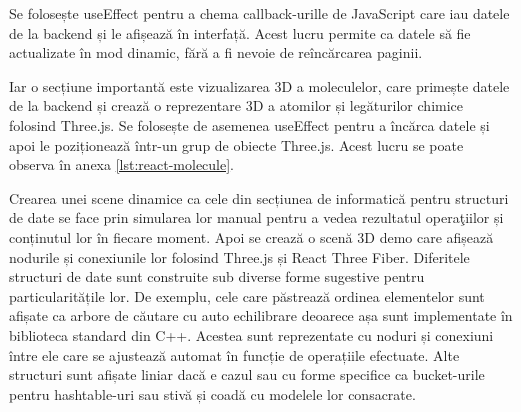 Se folosește useEffect pentru a chema
callback-urille de JavaScript care iau datele de la backend și le afișează în interfață.
Acest lucru permite ca datele să fie actualizate în mod dinamic, fără a fi nevoie 
de reîncărcarea paginii.


Iar o secțiune importantă este vizualizarea 3D a moleculelor, care primește datele de la backend și crează o reprezentare
3D a atomilor și legăturilor chimice folosind Three.js. Se folosește de asemenea useEffect pentru a 
încărca datele și apoi le poziționează într-un grup de obiecte Three.js. Acest lucru se poate
observa în anexa \ref{lst:react-molecule}.

Crearea unei scene dinamice ca cele din secțiunea de informatică pentru structuri de date se face prin
simularea lor manual pentru
a vedea rezultatul operaţiilor și conținutul lor în fiecare moment. Apoi se crează o scenă 3D
demo care afișează nodurile și conexiunile lor folosind Three.js și React Three Fiber.
Diferitele structuri de date sunt construite sub diverse forme sugestive pentru
particularitățile lor. De exemplu, cele care păstrează ordinea elementelor sunt afișate
ca arbore de căutare cu auto echilibrare deoarece așa sunt implementate în biblioteca
standard din C++. Acestea sunt reprezentate cu noduri și conexiuni între ele care
se ajustează automat în funcție de operațiile efectuate. Alte structuri sunt afișate
liniar dacă e cazul sau cu forme specifice ca bucket-urile pentru hashtable-uri
sau stivă și coadă cu modelele lor consacrate.

